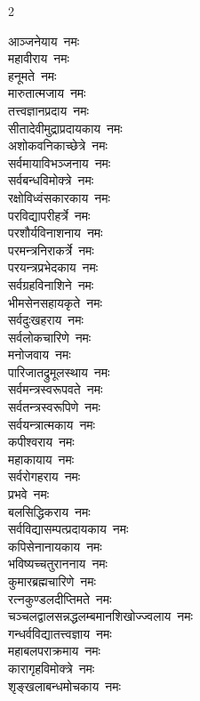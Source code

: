 \begin{multicols}{2}
\begin{flushleft}
आञ्जनेयाय~नमः\\
महावीराय~नमः\\
हनूमते~नमः\\
मारुतात्मजाय~नमः\\
तत्त्वज्ञानप्रदाय~नमः\\
सीतादेवीमुद्राप्रदायकाय~नमः\\
अशोकवनिकाच्छेत्रे~नमः\\
सर्वमायाविभञ्जनाय~नमः\\
सर्वबन्धविमोक्त्रे~नमः\\
रक्षोविध्वंसकारकाय~नमः\hfill{}\\
परविद्यापरीहर्त्रे~नमः\\
परशौर्यविनाशनाय~नमः\\
परमन्त्रनिराकर्त्रे~नमः\\
परयन्त्रप्रभेदकाय~नमः\\
सर्वग्रहविनाशिने~नमः\\
भीमसेनसहायकृते~नमः\\
सर्वदुःखहराय~नमः\\
सर्वलोकचारिणे~नमः\\
मनोजवाय~नमः\\
पारिजातद्रुमूलस्थाय~नमः\hfill{}\\
सर्वमन्त्रस्वरूपवते~नमः\\
सर्वतन्त्रस्वरूपिणे~नमः\\
सर्वयन्त्रात्मकाय~नमः\\
कपीश्वराय~नमः\\
महाकायाय~नमः\\
सर्वरोगहराय~नमः\\
प्रभवे~नमः\\
बलसिद्धिकराय~नमः\\
सर्वविद्यासम्पत्प्रदायकाय~नमः\\
कपिसेनानायकाय~नमः\hfill{}\\
भविष्यच्चतुराननाय~नमः\\
कुमारब्रह्मचारिणे~नमः\\
रत्नकुण्डलदीप्तिमते~नमः\\
चञ्चलद्वालसन्नद्ध\-लम्बमानशिखोज्ज्वलाय~नमः\\
गन्धर्वविद्यातत्त्वज्ञाय~नमः\\
महाबलपराक्रमाय~नमः\\
कारागृहविमोक्त्रे~नमः\\
शृङ्खलाबन्धमोचकाय~नमः\\

\end{flushleft}
\end{multicols}
